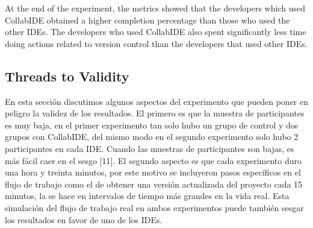 At the end of the experiment, the metrics showed that the developers which used CollabIDE obtained 
a higher completion percentage than those who used the other IDEs. The developers who used 
CollabIDE also spent significantly less time doing actions related to version control than the 
developers that used other IDEs.

\subsection{Threads to Validity}
En esta sección discutimos algunos aspectos del experimento que pueden poner en peligro la validez de los resultados. El primero es que la muestra de participantes es muy baja, en el primer experimento tan solo hubo un grupo de control y dos grupos con CollabIDE, del mismo modo en el segundo experimento solo hubo 2 participantes en cada IDE. Cuando las muestras de participantes son bajas, es más fácil caer en el sesgo [11]. El segundo aspecto es que cada experimento duro una hora y treinta minutos, por este motivo se incluyeron pasos específicos en el flujo de trabajo como el de obtener una versión actualizada del proyecto cada 15 minutos, la se hace en intervalos de tiempo más grandes en la vida real. Esta simulación del flujo de trabajo real en ambos experimentos puede también sesgar los resultados en favor de uno de los IDEs.  


\endinput